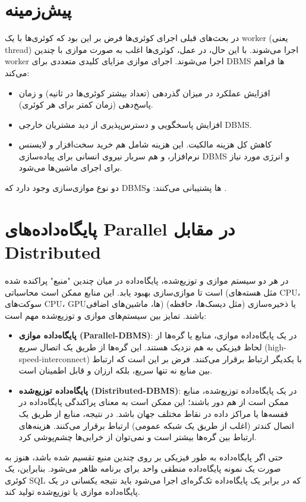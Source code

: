 \section{پیش‌زمینه}
در بحث‌های قبلی اجرای کوئری‌ها فرض بر این بود که کوئری‌ها با یک worker (یعنی thread) اجرا می‌شوند. با این حال، در عمل، کوئری‌ها اغلب به صورت موازی با چندین worker اجرا می‌شوند.
اجرای موازی مزایای کلیدی متعددی برای DBMS ها فراهم می‌کند:
\begin{itemize}
	\item افزایش عملکرد در میزان گذردهی (تعداد بیشتر کوئری‌ها در ثانیه) و زمان پاسخ‌دهی (زمان کمتر برای هر کوئری).
	
	\item افزایش پاسخگویی و دسترس‌پذیری از دید مشتریان خارجی DBMS.
	
	\item کاهش کل هزینه مالکیت. این هزینه شامل هم خرید سخت‌افزار و لایسنس نرم‌افزار، و هم سربار نیروی انسانی برای پیاده‌سازی DBMS و انرژی مورد نیاز برای اجرای ماشین‌ها می‌شود.
\end{itemize}
دو نوع موازی‌سازی وجود دارد که DBMSها پشتیبانی می‌کنند:  و .

\section{پایگاه‌داده‌های Parallel در مقابل Distributed}
در هر دو سیستم موازی و توزیع‌شده، پایگاه‌داده در میان چندین "منبع" پراکنده شده است تا موازی‌سازی بهبود یابد. این منابع ممکن است محاسباتی (مثل هسته‌های CPU، سوکت‌های CPU، GPUها، ماشین‌های اضافی) یا ذخیره‌سازی (مثل دیسک‌ها، حافظه) باشند.
تمایز بین سیستم‌های موازی و توزیع‌شده مهم است:
\begin{itemize}
	\item \textbf{پایگاه‌داده موازی (Parallel-DBMS)}: در یک پایگاه‌داده موازی، منابع یا گره‌ها از لحاظ فیزیکی به هم نزدیک هستند. این گره‌ها از طریق یک اتصال سریع (high-speed-interconnect) با یکدیگر ارتباط برقرار می‌کنند. فرض بر این است که ارتباط بین منابع نه تنها سریع، بلکه ارزان و قابل اطمینان است.
	
	\item \textbf{پایگاه‌داده توزیع‌شده (Distributed-DBMS)}: در یک پایگاه‌داده توزیع‌شده، منابع ممکن است از هم دور باشند؛ این ممکن است به معنای پراکندگی پایگاه‌داده در قفسه‌ها یا مراکز داده در نقاط مختلف جهان باشد. در نتیجه، منابع از طریق یک اتصال کندتر (اغلب از طریق یک شبکه عمومی) ارتباط برقرار می‌کنند. هزینه‌های ارتباط بین گره‌ها بیشتر است و نمی‌توان از خرابی‌ها چشم‌پوشی کرد.
\end{itemize}
حتی اگر پایگاه‌داده به طور فیزیکی بر روی چندین منبع تقسیم شده باشد، هنوز به صورت یک نمونه پایگاه‌داده منطقی واحد برای برنامه ظاهر می‌شود. بنابراین، یک کوئری SQL که در برابر یک پایگاه‌داده تک‌گره‌ای اجرا می‌شود باید نتیجه یکسانی در یک پایگاه‌داده موازی یا توزیع‌شده تولید کند.


